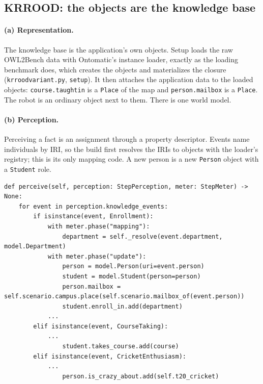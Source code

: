 \documentclass[10pt]{article}
\newcommand{\brkunderscore}{\textunderscore\allowbreak}
\newcommand{\code}[1]{{\let\_\brkunderscore\texttt{#1}}}
\newcommand{\file}[1]{{\let\_\brkunderscore\texttt{#1}}}
\begin{document}
\subsection{KRROOD: the objects are the knowledge base}
\label{sec:krrood}

\paragraph{(a) Representation.} The knowledge base is the application's own objects. Setup loads the raw OWL2Bench
data with Ontomatic's instance loader, exactly as the loading benchmark does, which creates the objects and materializes
the closure (\file{krrood\_variant.py}, \code{setup}). It then attaches the application data to the loaded objects:
\code{course.taught\_in} is a \code{Place} of the map and \code{person.mailbox} is a \code{Place}. The robot is an
ordinary object next to them. There is one world model.

\paragraph{(b) Perception.} Perceiving a fact is an assignment through a property descriptor. Events name individuals by
IRI, so the build first resolves the IRIs to objects with the loader's registry; this is its only mapping code. A new
person is a new \code{Person} object with a \code{Student} role.
\begin{lstlisting}[style=py]
def perceive(self, perception: StepPerception, meter: StepMeter) -> None:
    for event in perception.knowledge_events:
        if isinstance(event, Enrollment):
            with meter.phase("mapping"):
                department = self._resolve(event.department, model.Department)
            with meter.phase("update"):
                person = model.Person(uri=event.person)
                student = model.Student(person=person)
                person.mailbox = self.scenario.campus.place(self.scenario.mailbox_of(event.person))
                student.enroll_in.add(department)
            ...
        elif isinstance(event, CourseTaking):
            ...
                student.takes_course.add(course)
        elif isinstance(event, CricketEnthusiasm):
            ...
                person.is_crazy_about.add(self.t20_cricket)
\end{lstlisting}
\end{document}
